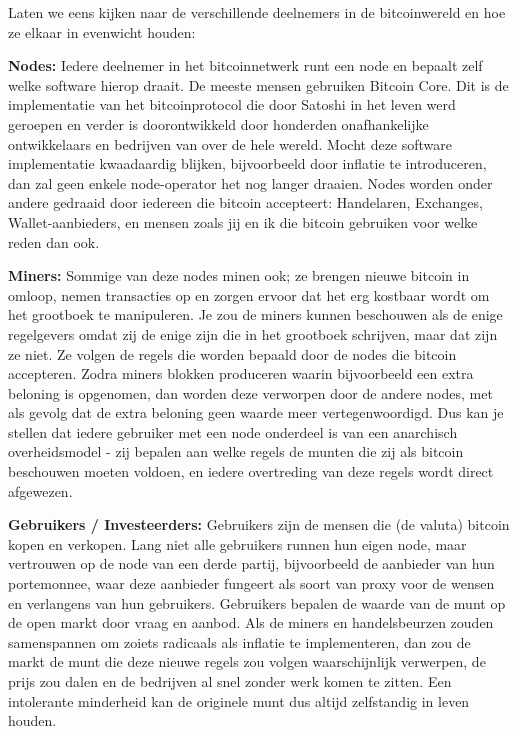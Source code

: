 Laten we eens kijken naar de verschillende deelnemers in de bitcoinwereld en hoe ze elkaar in evenwicht houden:

\noindent\textbf{Nodes:} 
Iedere deelnemer in het bitcoinnetwerk runt een node en bepaalt zelf welke software hierop draait. De meeste mensen gebruiken Bitcoin Core. Dit is de implementatie van het bitcoinprotocol die door Satoshi in het leven werd geroepen en verder is doorontwikkeld door honderden onafhankelijke ontwikkelaars en bedrijven van over de hele wereld. Mocht deze software implementatie kwaadaardig blijken, bijvoorbeeld door inflatie te introduceren, dan zal geen enkele node-operator het nog langer draaien. Nodes worden onder andere gedraaid door iedereen die bitcoin accepteert: Handelaren, Exchanges, Wallet-aanbieders, en mensen zoals jij en ik die bitcoin gebruiken voor welke reden dan ook. 

\noindent\textbf{Miners:} 
Sommige van deze nodes minen ook; ze brengen nieuwe bitcoin in omloop, nemen transacties op en zorgen ervoor dat het erg kostbaar wordt om het grootboek te manipuleren. Je zou de miners kunnen beschouwen als de enige regelgevers omdat zij de enige zijn die in het grootboek schrijven, maar dat zijn ze niet. Ze volgen de regels die worden bepaald door de nodes die bitcoin accepteren. Zodra miners blokken produceren waarin bijvoorbeeld een extra beloning is opgenomen, dan worden deze verworpen door de andere nodes, met als gevolg dat de extra beloning geen waarde meer vertegenwoordigd. Dus kan je stellen dat iedere gebruiker met een node onderdeel is van een anarchisch overheidsmodel - zij bepalen aan welke regels de munten die zij als bitcoin beschouwen moeten voldoen, en iedere overtreding van deze regels wordt direct afgewezen.

\noindent\textbf{Gebruikers / Investeerders:} 
Gebruikers zijn de mensen die (de valuta) bitcoin kopen en verkopen. Lang niet alle gebruikers runnen hun eigen node, maar vertrouwen op de node van een derde partij, bijvoorbeeld de aanbieder van hun portemonnee, waar deze aanbieder fungeert als soort van proxy voor de wensen en verlangens van hun gebruikers. Gebruikers bepalen de waarde van de munt op de open markt door vraag en aanbod. Als de miners en handelsbeurzen zouden samenspannen om zoiets radicaals als inflatie te implementeren, dan zou de markt de munt die deze nieuwe regels zou volgen waarschijnlijk verwerpen, de prijs zou dalen en de bedrijven al snel zonder werk komen te zitten. Een intolerante minderheid kan de originele munt dus altijd zelfstandig in leven houden.

